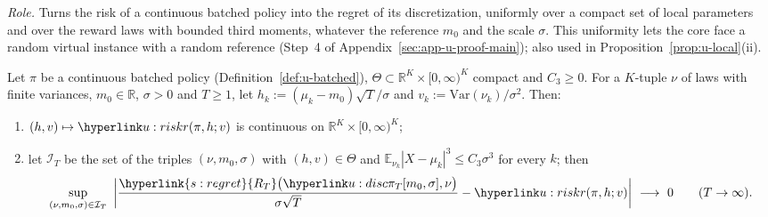 \documentclass[11pt]{article}
\DeclareRobustCommand{\sy}[2]{{\hyperlink{#1}{#2}}}
\newcommand{\R}{\mathbb{R}}
\newcommand{\E}{\mathbb{E}}
\newcommand{\1}{\mathbf{1}}
\newcommand{\RT}{\sy{s:regret}{R_T}}
\begin{document}
\begin{theorem}\label{thm:u-transfer}
\textit{Role.} Turns the risk of a continuous batched policy into the regret of its discretization, uniformly over a compact set of local parameters and over the
reward laws with bounded third moments, whatever the reference $m_0$ and the scale $\sigma$. This uniformity lets the core face a random virtual instance
with a random reference (Step~4 of Appendix~\ref{sec:app-u-proof-main}); also used in Proposition~\ref{prop:u-local}(ii).

\noindent Let $\pi$ be a continuous batched policy (Definition~\ref{def:u-batched}), $\Theta\subset\R^K\times[0,\infty)^K$ compact and $C_3\ge0$. For a
$K$-tuple $\nu$ of laws with finite variances, $m_0\in\R$, $\sigma>0$ and $T\ge1$, let $h_k:=(\mu_k-m_0)\sqrt T/\sigma$ and $v_k:=\mathrm{Var}(\nu_k)/\sigma^2$.
Then:
\begin{enumerate}
\item[(i)] $(h,v)\mapsto\urk(\pi,h;v)$ is continuous on $\R^K\times[0,\infty)^K$;
\item[(ii)] let $\mathcal I_T$ be the set of the triples $(\nu,m_0,\sigma)$ with $(h,v)\in\Theta$ and $\E_{\nu_k}|X-\mu_k|^3\le C_3\sigma^3$ for every $k$; then
\[
\sup_{(\nu,m_0,\sigma)\in\mathcal I_T}\ \bigg|\frac{\RT\big(\uDisc{\pi}{T}{m_0,\sigma},\nu\big)}{\sigma\sqrt T}-\urk(\pi,h;v)\bigg|\ \longrightarrow\ 0\qquad(T\to\infty).
\]
\end{enumerate}
\end{theorem}
\end{document}
